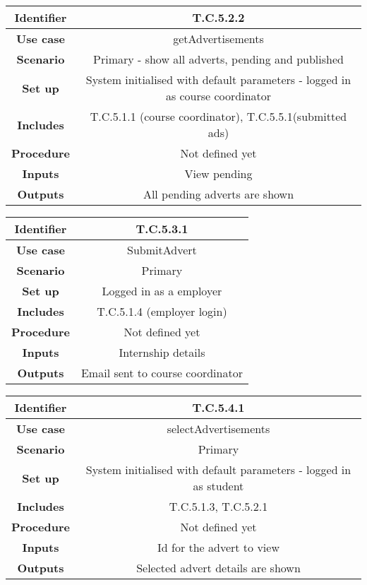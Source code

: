 \begin{tabular}{|c|c|}
\hline \textbf{Identifier} & T.C.5.2.2 \\
\hline \textbf{Use case} & getAdvertisements\\
\hline \textbf{Scenario} & Primary - show all adverts, pending and published\\
\hline \textbf{Set up} & System initialised with default parameters - logged in as course coordinator\\
\hline \textbf{Includes} &T.C.5.1.1 (course coordinator), T.C.5.5.1(submitted ads)\\
\hline \textbf{Procedure} & Not defined yet\\
\hline \textbf{Inputs} & View pending\\
\hline \textbf{Outputs} & All pending adverts are shown\\
\hline
\end{tabular}

\begin{tabular}{|c|c|}
\hline \textbf{Identifier} & T.C.5.3.1\\
\hline \textbf{Use case} & SubmitAdvert\\
\hline \textbf{Scenario} & Primary\\
\hline \textbf{Set up} & Logged in as a employer\\
\hline \textbf{Includes} & T.C.5.1.4 (employer login)\\
\hline \textbf{Procedure} & Not defined yet\\
\hline \textbf{Inputs} & Internship details\\
\hline \textbf{Outputs} & Email sent to course coordinator\\
\hline
\end{tabular}

\begin{tabular}{|c|c|}
\hline \textbf{Identifier} & T.C.5.4.1\\
\hline \textbf{Use case} & selectAdvertisements\\
\hline \textbf{Scenario} & Primary\\
\hline \textbf{Set up} & System initialised with default parameters - logged in as student\\
\hline \textbf{Includes} & T.C.5.1.3, T.C.5.2.1\\
\hline \textbf{Procedure} & Not defined yet\\
\hline \textbf{Inputs} & Id for the advert to view\\
\hline \textbf{Outputs} & Selected advert details are shown\\
\hline
\end{tabular}

